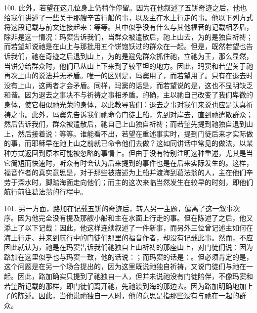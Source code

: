 100. 此外，若望在这几位身上仍稍作停留。因为在他叙述了五饼奇迹之后，他也给我们讲述了一些关于那艘辛苦行船的事，以及主在水上行走的事。他以下列方式将这段记载与前文连接起来：等等。其中似乎没有什么与其他福音的记载相矛盾，除非是这一情况：玛窦告诉我们，当群众被遣散后，祂上山去，为的是独自祈祷；而若望却说祂是在山上与那批用五个饼饱饫过的群众在一起。但是，既然若望也告诉我们，祂在奇迹之后退到山上，为的是避免群众抓住祂，立祂为王，那么显然，当饼分给群众时，他们已从山上下来到了较平坦的地方。因此，玛窦和若望关于祂再次上山的说法并无矛盾。唯一的区别是，玛窦用了，而若望用了。只有在退去时没有上山，这两者才会矛盾。同样，玛窦的话是，而若望说的是，这也不显明缺乏和谐。因为退去之事决不与祈祷之事相矛盾。的确，主以祂自己改变了我们卑微的身体，使它相似祂光荣的身体，以此教导我们：退去之事对我们来说也应是认真祈祷之事。此外，玛窦先告诉我们祂命令门徒上船，先到对岸去，直到祂遣散群众；然后告诉我们，群众被遣散后，祂自己上山独自祈祷；而若望先提到祂独自退到山上，然后接着说：等等。谁能看不出，若望在重述事实时，提到门徒后来才实际做的事，而耶稣早在祂上山之前就已命令他们去做？这如同讲话中常见的做法，以某种方式返回到原本可能被忽略的事情上。但由于没有特别注明这种重述，尤其是当它简短而快速时，听众有时会认为后来提到的事件也是在后来实际发生的。这样，福音作者的真实意思是，对于那些被描述为上船并渡海到葛法翁的人，主在他们辛劳于深水时，脚踏海面走向他们；而主的这次来临当然发生在较早的时刻，即他们航行前往葛法翁的行程中。\par

101. 另一方面，路加在记载五饼的奇迹后，转入另一主题，偏离了这一叙事次序。因为他完全没有提及那艘小船和主在水面上行走的事。但在陈述了之后，他又添上了以下记载：因此，他这样连续叙述了一件新事，而另外三位曾记述主如何在海上行走、并来到航行中的门徒们那里的福音作者，却没有记载此事。然而，不应因此就认为，祂是在玛窦告诉我们祂独自上山祈祷的那座山上，对门徒们说：因为路加在这里似乎也与玛窦一致，他的话说：；而玛窦的话是：。但必须肯定的是，这个问题是在另一个场合提出的，因为这里既说祂独自祈祷，又说门徒们与祂在一起。因此，路加确实只提到了祂独自一人，但并未说祂没有门徒陪伴，不像玛窦和若望所记载的那样，即门徒们离开祂，先祂渡到海的那边去。因为路加明确地加上了的陈述。因此，当他说祂独自一人时，他的意思是指那些没有与祂在一起的群众。\par

